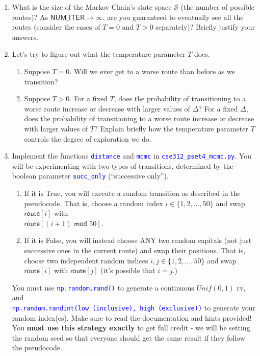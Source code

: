 \documentclass[12pt]{article}
\def\code#1{\textcolor{blue}{\texttt{#1}}}
\renewcommand{\|}{\mid}
\begin{document}
\begin{enumerate}
\begin{enumerate}
    \item What is the size of the Markov Chain's state space $\mathcal{S}$ (the number of possible routes)? As $\textsf{NUM\_ITER}\to\infty$, are you guaranteed to eventually see all the routes (consider the cases of $T=0$ and $T>0$ separately)? Briefly justify your answers.
    \item Let's try to figure out what the temperature parameter $T$ does. 
    \begin{enumerate}
        \item Suppose $T=0$. Will we ever get to a worse route than before as we transition?
        \item Suppose $T>0$. For a fixed $T$, does the probability of transitioning to a worse route increase or decrease with larger values of $\Delta$? For a fixed $\Delta$, does the probability of transitioning to a worse route increase or decrease with larger values of $T$? Explain briefly how the temperature parameter $T$ controls the degree of exploration we do.
    \end{enumerate}
    \item Implement the functions \code{distance} and \code{mcmc} in \code{cse312\_pset4\_mcmc.py}. You will be experimenting with two types of transitions, determined by the boolean parameter \code{succ\_only} (``successive only''). 
    \begin{enumerate}
        \item If it is True, you will execute a random transition as described in the pseudocode.  That is, choose a random index $i\in\{1,2,\dots,50\}$ and swap $\textsf{route}[i]$ with\\ $\textsf{route}[(i+1) \textsf{ mod } 50]$.
        \item If it is False, you will instead choose ANY two random capitals (not just successive ones in the current route) and swap their positions. That is, choose two independent random indices $i,j\in\{1,2,\dots,50\}$ and swap $\textsf{route}[i]$ with $\textsf{route}[j]$ (it's possible that $i=j$.)
    \end{enumerate}
    You must use \code{np.random.rand()} to generate a continuous $Unif(0,1)$ rv, and\\ \code{np.random.randint(low (inclusive), high (exclusive))} to generate your random index(es). Make sure to read the documentation and hints provided! You \textbf{must use this strategy exactly} to get full credit - we will be setting the random seed so that everyone should get the same result if they follow the pseudocode.

\end{enumerate}
\end{enumerate}
\end{document}
